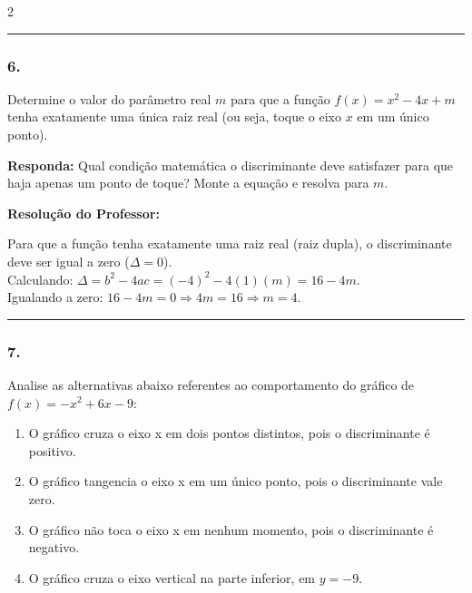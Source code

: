 \begin{multicols*}{2}
\par\vspace{\espacoQuestao}

\noindent\textcolor{CorLinha}{\rule{\linewidth}{0.5pt}} 
\par\vspace{\espacoPreQuestao}
\subsubsection*{6.} Determine o valor do parâmetro real $m$ para que a função $f(x) = x^2 - 4x + m$ tenha exatamente uma única raiz real (ou seja, toque o eixo $x$ em um único ponto).

\begin{boxresponda}
\textbf{Responda:} Qual condição matemática o discriminante deve satisfazer para que haja apenas um ponto de toque? Monte a equação e resolva para $m$.
\end{boxresponda}

\ifgabarito
    \begin{tcolorbox}[colback=CorTitUm!5, colframe=CorTitUm, boxrule=1pt, arc=4pt, left=6pt, right=6pt, top=6pt, bottom=6pt]
    \small\textbf{\textcolor{CorTitUm}{Resolução do Professor:}}\par\vspace{0.1cm}
    \color{CinzaEscuro}
    Para que a função tenha exatamente uma raiz real (raiz dupla), o discriminante deve ser igual a zero ($\Delta = 0$). \\
    Calculando: $\Delta = b^2 - 4ac = (-4)^2 - 4(1)(m) = 16 - 4m$. \\
    Igualando a zero: $16 - 4m = 0 \Rightarrow 4m = 16 \Rightarrow m = 4$.
    \end{tcolorbox}
\fi

\par\vspace{\espacoQuestao}

\noindent\textcolor{CorLinha}{\rule{\linewidth}{0.5pt}} 
\par\vspace{\espacoPreQuestao}
\subsubsection*{7.} Analise as alternativas abaixo referentes ao comportamento do gráfico de $f(x) = -x^2 + 6x - 9$:

\begin{enumerate}[label=\alph*), itemsep=\espacoAlt]
\item O gráfico cruza o eixo x em dois pontos distintos, pois o discriminante é positivo.
\item O gráfico tangencia o eixo x em um único ponto, pois o discriminante vale zero.
\item O gráfico não toca o eixo x em nenhum momento, pois o discriminante é negativo.
\item O gráfico cruza o eixo vertical na parte inferior, em $y = -9$.
\end{enumerate}


\end{multicols*}
